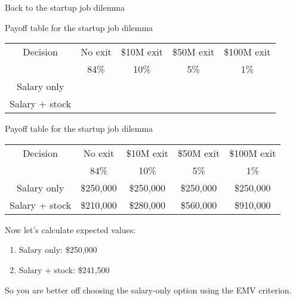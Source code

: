 \documentclass{beamer}\usepackage[]{graphicx}\usepackage[]{color}
\begin{document}
\begin{darkframes}
\begin{frame}{Back to the startup job dilemma}
  \end{frame}

  \begin{frame}{Payoff table for the startup job dilemma}
    \begin{center}
      \begin{tabular}{c|cccc}
        Decision & No exit & \$10M exit & \$50M exit & \$100M exit \\
        & 84\% & 10\% & 5\% & 1\% \\
        \hline
        Salary only &  \\
        Salary + stock &  \\
      \end{tabular}
    \end{center}


  \end{frame}

  \begin{frame}{Payoff table for the startup job dilemma}
    \begin{center}
      \begin{tabular}{c|cccc}
        Decision & No exit & \$10M exit & \$50M exit & \$100M exit \\
        & 84\% & 10\% & 5\% & 1\% \\
        \hline
        Salary only & \$250,000 & \$250,000 & \$250,000 & \$250,000 \\
        Salary + stock & \$210,000 & \$280,000 & \$560,000 & \$910,000 \\
      \end{tabular}
    \end{center}
    \vspace{0.2in}

    Now let's calculate expected values:

    \begin{enumerate}
      \item Salary only: \$250,000 \\
      \item Salary + stock: \$241,500
    \end{enumerate}

    So you are better off choosing the salary-only option using the EMV criterion.
  \end{frame}


\end{darkframes}
\end{document}
